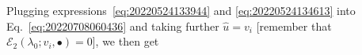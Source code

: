 \documentclass[12pt, final]{scrartcl}
\theoremstyle{definition}
\newcommand{\E}{\mathcal E}
\newcommand{\order}[2][1]{#2^{(#1)}}
\begin{document}
Plugging expressions~\eqref{eq:20220524133944} and \eqref{eq:20220524134613} into Eq.~\eqref{eq:20220708060436} and
taking further $\hat{u} = v_i$ [remember that $\E_2(\lambda_0; v_i, \bullet) = 0$], we then get
\end{document}
